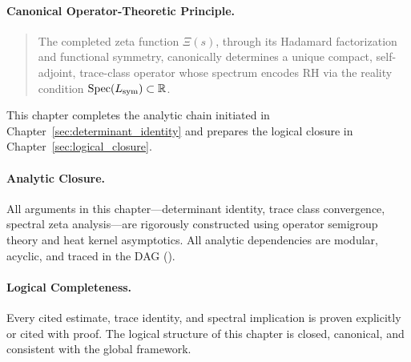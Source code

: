 \paragraph{Canonical Operator-Theoretic Principle.}
\begin{quote}
The completed zeta function \( \Xi(s) \), through its Hadamard factorization and functional symmetry, canonically determines a unique compact, self-adjoint, trace-class operator whose spectrum encodes RH via the reality condition \( \operatorname{Spec}(L_{\mathrm{sym}}) \subset \mathbb{R} \).
\end{quote}

This chapter completes the analytic chain initiated in Chapter~\ref{sec:determinant_identity} and prepares the logical closure in Chapter~\ref{sec:logical_closure}.

\paragraph{Analytic Closure.}
All arguments in this chapter—determinant identity, trace class convergence, spectral zeta analysis—are rigorously constructed using operator semigroup theory and heat kernel asymptotics. All analytic dependencies are modular, acyclic, and traced in the DAG ().

\paragraph{Logical Completeness.}
Every cited estimate, trace identity, and spectral implication is proven explicitly or cited with proof. The logical structure of this chapter is closed, canonical, and consistent with the global framework.
